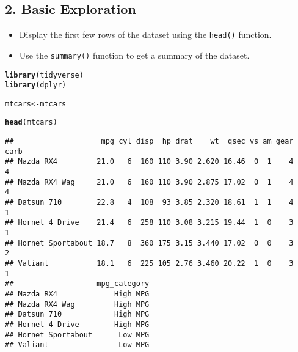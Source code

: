 \documentclass[11pt]{article}\usepackage[]{graphicx}\usepackage[]{xcolor}
\makeatletter
\newcommand{\hlstd}[1]{\textcolor[rgb]{0.345,0.345,0.345}{#1}}%
\newcommand{\hlkwb}[1]{\textcolor[rgb]{0.69,0.353,0.396}{#1}}%
\newcommand{\hlkwd}[1]{\textcolor[rgb]{0.737,0.353,0.396}{\textbf{#1}}}%
\newenvironment{kframe}{%
 \def\at@end@of@kframe{}%
 \ifinner\ifhmode%
  \def\at@end@of@kframe{\end{minipage}}%
  \begin{minipage}{\columnwidth}%
 \fi\fi%
 \def\FrameCommand##1{\hskip\@totalleftmargin \hskip-\fboxsep
 \colorbox{shadecolor}{##1}\hskip-\fboxsep
     \hskip-\linewidth \hskip-\@totalleftmargin \hskip\columnwidth}%
 \MakeFramed {\advance\hsize-\width
   \@totalleftmargin\z@ \linewidth\hsize
   \@setminipage}}%
 {\par\unskip\endMakeFramed%
 \at@end@of@kframe}
\newenvironment{knitrout}{}{} %
\makeatother
\begin{document}
\subsection*{2. Basic Exploration}
\begin{itemize}
    \item Display the first few rows of the dataset using the \texttt{head()} function.
    \item Use the \texttt{summary()} function to get a summary of the dataset.
\end{itemize}
\begin{knitrout}
\color{fgcolor}\begin{kframe}
\begin{alltt}
\hlkwd{library}\hlstd{(tidyverse)}
\hlkwd{library}\hlstd{(dplyr)}

\hlstd{mtcars} \hlkwb{<-} \hlstd{mtcars}

\hlkwd{head}\hlstd{(mtcars)}
\end{alltt}
\begin{verbatim}
##                    mpg cyl disp  hp drat    wt  qsec vs am gear carb
## Mazda RX4         21.0   6  160 110 3.90 2.620 16.46  0  1    4    4
## Mazda RX4 Wag     21.0   6  160 110 3.90 2.875 17.02  0  1    4    4
## Datsun 710        22.8   4  108  93 3.85 2.320 18.61  1  1    4    1
## Hornet 4 Drive    21.4   6  258 110 3.08 3.215 19.44  1  0    3    1
## Hornet Sportabout 18.7   8  360 175 3.15 3.440 17.02  0  0    3    2
## Valiant           18.1   6  225 105 2.76 3.460 20.22  1  0    3    1
##                   mpg_category
## Mazda RX4             High MPG
## Mazda RX4 Wag         High MPG
## Datsun 710            High MPG
## Hornet 4 Drive        High MPG
## Hornet Sportabout      Low MPG
## Valiant                Low MPG
\end{verbatim}
\end{kframe}
\end{knitrout}
\clearpage
\end{document}
